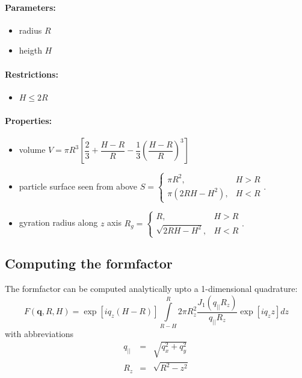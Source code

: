 \paragraph{Parameters:}
\begin{itemize}
\item radius $R$
\item heigth $H$
\end{itemize}
\paragraph{Restrictions:}
\begin{itemize}
\item $H\leq 2R$
\end{itemize}
\paragraph{Properties:}
\begin{itemize}
\item volume $V=\pi R^3 \left[\dfrac{2}{3} + \dfrac{H-R}{R} - \dfrac{1}{3}\left(\dfrac{H-R}{R}\right)^3\right]$
\item particle surface seen from above $S = \left\{\begin{array}{ll} \pi R^2, & H > R \\
         \pi\left(2RH-H^2\right), & H < R \end{array}\right. .$
\item gyration radius along $z$ axis $R_g = \left\{\begin{array}{ll}  R, & H > R \\
         \sqrt{2RH-H^2}, & H < R \end{array}\right. .$
\end{itemize}


\subsection{Computing the formfactor}
The formfactor can be computed analytically upto a 1-dimensional quadrature:
\begin{equation}
F(\mathbf q, R, H) = \exp\left[iq_z\left(H-R\right)\right]\int\limits_{R-H}^{R}{2\pi R_z^2\frac{J_1(q_{||}R_z)}{q_{||}R_z}\exp\left[iq_zz\right]dz} 
\label{eq:ffsphere}
\end{equation}
with abbreviations
\begin{eqnarray}
q_{||} &=& \sqrt{q_x^2+q_y^2} \\
R_z &=& \sqrt{R^2-z^2} 
\end{eqnarray}

